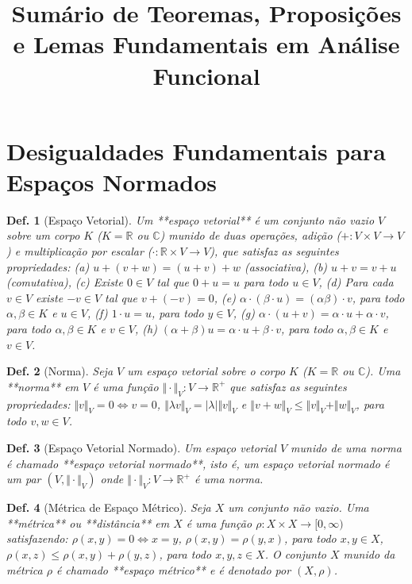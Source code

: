 \documentclass[11pt]{article}
\theoremstyle{yellowhead}
\theoremstyle{yellowdef}
\newtheorem*{definition}{Def.}
\begin{document}
\title{Sumário de Teoremas, Proposições e Lemas Fundamentais em Análise Funcional}
\author{}
\date{}

\section{Desigualdades Fundamentais para Espaços Normados}

\begin{multicols}{3}

\begin{definition}[Espaço Vetorial]
Um **espaço vetorial** é um conjunto não vazio $V$ sobre um corpo $K$ ($K = \mathbb{R}$ ou $\mathbb{C}$) munido de duas operações, adição ($+: V \times V \rightarrow V$) e multiplicação por escalar ($\cdot: \mathbb{R} \times V \rightarrow V$), que satisfaz as seguintes propriedades: (a) $u + (v + w) = (u + v) + w$ (associativa), (b) $u + v = v + u$ (comutativa), (c) Existe $0 \in V$ tal que $0 + u = u$ para todo $u \in V$, (d) Para cada $v \in V$ existe $-v \in V$ tal que $v + (-v) = 0$, (e) $\alpha \cdot (\beta \cdot u) = (\alpha\beta) \cdot v$, para todo $\alpha, \beta \in K$ e $u \in V$, (f) $1 \cdot u = u$, para todo $y \in V$, (g) $\alpha \cdot (u + v) = \alpha \cdot u + \alpha \cdot v$, para todo $\alpha, \beta \in K$ e $v \in V$, (h) $(\alpha + \beta)u = \alpha \cdot u + \beta \cdot v$, para todo $\alpha, \beta \in K$ e $v \in V$.
\end{definition}

\begin{definition}[Norma]
Seja $V$ um espaço vetorial sobre o corpo $K$ ($K = \mathbb{R}$ ou $\mathbb{C}$). Uma **norma** em $V$ é uma função $\Vert \cdot \Vert_V : V \rightarrow \mathbb{R}^+$ que satisfaz as seguintes propriedades: $\Vert v \Vert_V = 0 \Leftrightarrow v = 0$, $\Vert \lambda v \Vert_V = |\lambda|\Vert v \Vert_V$ e $\Vert v + w \Vert_V \le \Vert v \Vert_V + \Vert w \Vert_V$, para todo $v, w \in V$.
\end{definition}

\begin{definition}[Espaço Vetorial Normado]
Um espaço vetorial $V$ munido de uma norma é chamado **espaço vetorial normado**, isto é, um espaço vetorial normado é um par $(V, \Vert \cdot \Vert_V)$ onde $\Vert \cdot \Vert_V : V \rightarrow \mathbb{R}^+$ é uma norma.
\end{definition}

\begin{definition}[Métrica de Espaço Métrico]
Seja $X$ um conjunto não vazio. Uma **métrica** ou **distância** em $X$ é uma função $\rho : X \times X \rightarrow [0, \infty)$ satisfazendo: $\rho(x, y) = 0 \Leftrightarrow x = y$, $\rho(x, y) = \rho(y, x)$, para todo $x, y \in X$, $\rho(x, z) \le \rho(x, y) + \rho(y, z)$, para todo $x, y, z \in X$. O conjunto $X$ munido da métrica $\rho$ é chamado **espaço métrico** e é denotado por $(X, \rho)$.
\end{definition}


\end{multicols}
\end{document}
